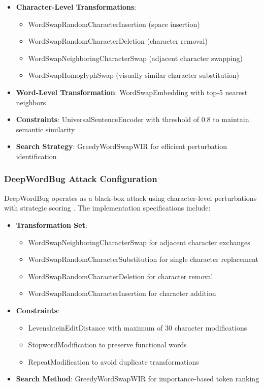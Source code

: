 \documentclass[../main.tex]{subfiles}
\begin{document}
\begin{itemize}
\item \textbf{Character-Level Transformations}:
\begin{itemize}
\item WordSwapRandomCharacterInsertion (space insertion)
\item WordSwapRandomCharacterDeletion (character removal)
\item WordSwapNeighboringCharacterSwap (adjacent character swapping)
\item WordSwapHomoglyphSwap (visually similar character substitution)
\end{itemize}
\item \textbf{Word-Level Transformation}: WordSwapEmbedding with top-5 nearest neighbors
\item \textbf{Constraints}: UniversalSentenceEncoder with threshold of 0.8 to maintain semantic similarity
\item \textbf{Search Strategy}: GreedyWordSwapWIR for efficient perturbation identification
\end{itemize}

\subsubsection{DeepWordBug Attack Configuration}

DeepWordBug operates as a black-box attack using character-level perturbations with strategic scoring \cite{gao2018deepwordbug}. The implementation specifications include:

\begin{itemize}
\item \textbf{Transformation Set}:
\begin{itemize}
\item WordSwapNeighboringCharacterSwap for adjacent character exchanges
\item WordSwapRandomCharacterSubstitution for single character replacement
\item WordSwapRandomCharacterDeletion for character removal
\item WordSwapRandomCharacterInsertion for character addition
\end{itemize}
\item \textbf{Constraints}:
\begin{itemize}
\item LevenshteinEditDistance with maximum of 30 character modifications
\item StopwordModification to preserve functional words
\item RepeatModification to avoid duplicate transformations
\end{itemize}
\item \textbf{Search Method}: GreedyWordSwapWIR for importance-based token ranking
\end{itemize}
\end{document}
